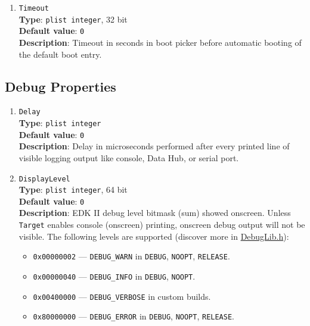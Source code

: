 \documentclass[]{article}
\providecommand{\tightlist}{%
  \setlength{\itemsep}{0pt}\setlength{\parskip}{0pt}}
\begin{document}
\begin{enumerate}
\item
  \texttt{Timeout}\\
  \textbf{Type}: \texttt{plist\ integer}, 32 bit\\
  \textbf{Default value}: \texttt{0}\\
  \textbf{Description}: Timeout in seconds in boot picker before
  automatic booting of the default boot entry.

\end{enumerate}

\subsection{Debug Properties}\label{miscdebugprops}

\begin{enumerate}

\item
  \texttt{Delay}\\
  \textbf{Type}: \texttt{plist\ integer}\\
  \textbf{Default value}: \texttt{0}\\
  \textbf{Description}: Delay in microseconds performed after
  every printed line of visible logging output like console,
  Data Hub, or serial port.

\item
  \texttt{DisplayLevel}\\
  \textbf{Type}: \texttt{plist\ integer}, 64 bit\\
  \textbf{Default value}: \texttt{0}\\
  \textbf{Description}: EDK II debug level bitmask (sum) showed onscreen.
  Unless \texttt{Target} enables console (onscreen) printing,
  onscreen debug output will not be visible. The following levels
  are supported (discover more in
  \href{https://github.com/tianocore/edk2/blob/UDK2018/MdePkg/Include/Library/DebugLib.h}{DebugLib.h}):

  \begin{itemize}
  \tightlist
    \item \texttt{0x00000002} --- \texttt{DEBUG\_WARN} in \texttt{DEBUG},
      \texttt{NOOPT}, \texttt{RELEASE}.
    \item \texttt{0x00000040} --- \texttt{DEBUG\_INFO} in \texttt{DEBUG},
      \texttt{NOOPT}.
    \item \texttt{0x00400000} --- \texttt{DEBUG\_VERBOSE} in custom builds.
    \item \texttt{0x80000000} --- \texttt{DEBUG\_ERROR} in \texttt{DEBUG},
      \texttt{NOOPT}, \texttt{RELEASE}.
  \end{itemize}


\end{enumerate}
\end{document}
